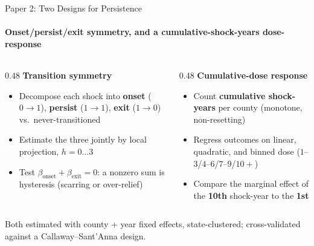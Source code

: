 \documentclass[aspectratio=169,11pt]{beamer}
\newcommand{\emphcolor}[1]{{\color{WarmOrange}\textbf{#1}}}
\newcommand{\tealtext}[1]{{\color{Teal}#1}}
\newcommand{\graytext}[1]{{\color{WarmGray}#1}}
\begin{document}
\begin{frame}{Paper 2: Two Designs for Persistence}
  \framesubtitle{Onset/persist/exit symmetry, and a cumulative-shock-years dose-response}
  \begin{columns}[T]
    \begin{column}{0.48\textwidth}
      \footnotesize
      \textbf{\tealtext{Transition symmetry}}
      \begin{itemize}\itemsep0.14em
        \item Decompose each shock into \emphcolor{onset} ($0{\to}1$), \emphcolor{persist} ($1{\to}1$), \emphcolor{exit} ($1{\to}0$) vs.\ never-transitioned
        \item Estimate the three jointly by local projection, $h{=}0\ldots3$
        \item Test \emphcolor{$\beta_\text{onset} + \beta_\text{exit} = 0$}: a nonzero sum is hysteresis (scarring or over-relief)
      \end{itemize}
    \end{column}
    \begin{column}{0.48\textwidth}
      \footnotesize
      \textbf{\tealtext{Cumulative-dose response}}
      \begin{itemize}\itemsep0.14em
        \item Count \emphcolor{cumulative shock-years} per county (monotone, non-resetting)
        \item Regress outcomes on linear, quadratic, and binned dose ($1$--$3$/$4$--$6$/$7$--$9$/$10{+}$)
        \item Compare the marginal effect of the \emphcolor{10th} shock-year to the \emphcolor{1st}
      \end{itemize}
    \end{column}
  \end{columns}
  \vspace{0.3em}
  \begin{center}\graytext{\scriptsize Both estimated with county + year fixed effects, state-clustered; cross-validated against a Callaway--Sant'Anna design.}\end{center}
\end{frame}
\end{document}
